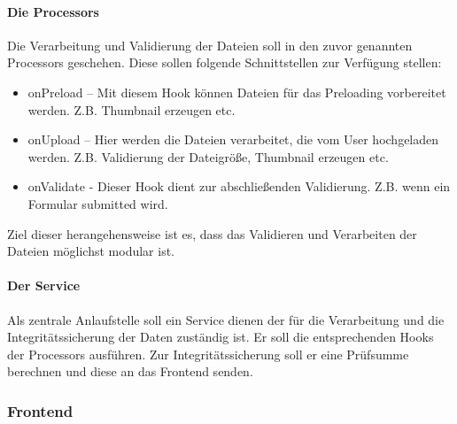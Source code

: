 \paragraph{Die Processors} Die Verarbeitung und Validierung der Dateien soll in den zuvor genannten Processors geschehen. Diese sollen folgende Schnittstellen zur Verfügung stellen:

\begin{itemize}
	\item onPreload 	– Mit diesem Hook können Dateien für das Preloading vorbereitet werden. Z.B. Thumbnail erzeugen etc.
	\item onUpload 		– Hier werden die Dateien verarbeitet, die vom User hochgeladen werden. Z.B. Validierung der Dateigröße, Thumbnail erzeugen etc.
	\item onValidate	- Dieser Hook dient zur abschließenden Validierung. Z.B. wenn ein Formular submitted wird.
\end{itemize}

Ziel dieser herangehensweise ist es, dass das Validieren und Verarbeiten der Dateien möglichst modular ist.

\paragraph{Der Service} Als zentrale Anlaufstelle soll ein Service dienen der für die Verarbeitung und die Integritätssicherung der Daten zuständig ist. Er soll die entsprechenden Hooks der Processors ausführen. Zur Integritätssicherung soll er eine Prüfsumme berechnen und diese an das Frontend senden.

\subsubsection{Frontend}
\label{sec:Frontend}

